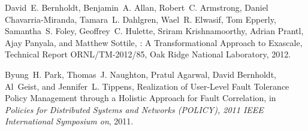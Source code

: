 
\renewcommand{\bibname}{Related and Recent Publications}
\begin{thebiobibliography}{99} %

\setlength{\itemsep}{0pt}

David~E. Bernholdt, Benjamin~A. Allan, Robert~C. Armstrong, Daniel
  Chavarria-Miranda, Tamara~L. Dahlgren, Wael~R. Elwasif, Tom Epperly,
  Samantha~S. Foley, Geoffrey~C. Hulette, Sriram Krishnamoorthy, Adrian Prantl,
  Ajay Panyala, and Matthew Sottile,
: A Transformational Approach to Exascale,
\newblock Technical Report ORNL/TM-2012/85, Oak Ridge National Laboratory,
  2012.

Byung~H. Park, Thomas~J. Naughton, Pratul Agarwal, David Bernholdt, Al~Geist,
  and Jennifer~L. Tippens,
\newblock Realization of User-Level Fault Tolerance Policy Management through a
  Holistic Approach for Fault Correlation,
\newblock in {\em Policies for Distributed Systems and Networks (POLICY), 2011
  IEEE International Symposium on}, 2011.





\end{thebiobibliography}
